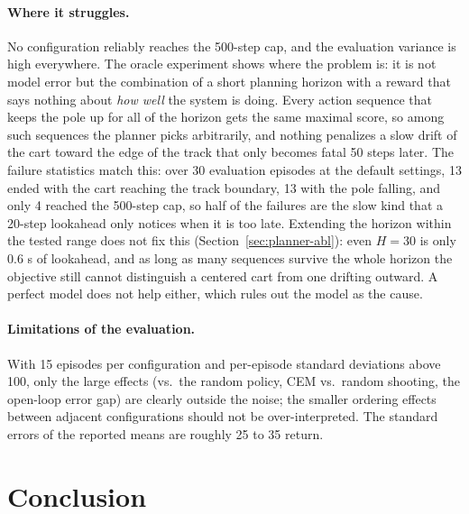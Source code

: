 \documentclass{article}
\begin{document}
\paragraph{Where it struggles.} No configuration reliably reaches the 500-step cap, and the evaluation variance is high everywhere. The oracle experiment shows where the problem is: it is not model error but the combination of a short planning horizon with a reward that says nothing about \emph{how well} the system is doing. Every action sequence that keeps the pole up for all of the horizon gets the same maximal score, so among such sequences the planner picks arbitrarily, and nothing penalizes a slow drift of the cart toward the edge of the track that only becomes fatal 50 steps later. The failure statistics match this: over 30 evaluation episodes at the default settings, 13 ended with the cart reaching the track boundary, 13 with the pole falling, and only 4 reached the 500-step cap, so half of the failures are the slow kind that a 20-step lookahead only notices when it is too late. Extending the horizon within the tested range does not fix this (Section~\ref{sec:planner-abl}): even $H = 30$ is only 0.6 s of lookahead, and as long as many sequences survive the whole horizon the objective still cannot distinguish a centered cart from one drifting outward. A perfect model does not help either, which rules out the model as the cause.

\paragraph{Limitations of the evaluation.} With 15 episodes per configuration and per-episode standard deviations above 100, only the large effects (vs.\ the random policy, CEM vs.\ random shooting, the open-loop error gap) are clearly outside the noise; the smaller ordering effects between adjacent configurations should not be over-interpreted. The standard errors of the reported means are roughly 25 to 35 return.

\section{Conclusion}
\end{document}
